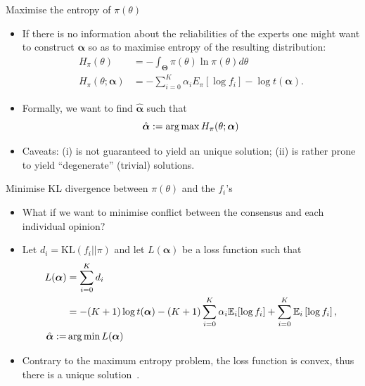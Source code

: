 \begin{frame}{Maximise the entropy of $ \pi(\theta)$ }
 \begin{itemize}
  \item If there is no information about the reliabilities of the experts one might want to construct $\boldsymbol\alpha$ so as to maximise entropy of the resulting distribution:
  \begin{align*}
   H_{\pi}(\theta) &=-\int_{\boldsymbol\Theta}\pi(\theta)\ln\pi(\theta)d\theta \\
   H_{\pi}(\theta; \boldsymbol\alpha) &= -\sum_{i=0}^{K} \alpha_i E_{\pi}[\log f_i] - \log t(\boldsymbol\alpha).
  \end{align*}
  \item Formally, we want to find $\hat{\boldsymbol\alpha}$ such that
  \[\hat{\boldsymbol\alpha}:= \operatorname*{arg\,max} H_{\pi}(\theta; \boldsymbol\alpha)  \]
  \item Caveats: (i) is not guaranteed to yield an unique solution; (ii) is rather prone to yield ``degenerate'' (trivial) solutions.
 \end{itemize}
\end{frame}
\begin{frame}{Minimise KL divergence between $\pi(\theta)$ and the $f_i$'s}
\begin{itemize}
 \item What if we want to minimise conflict between the consensus and each individual opinion?
 \item Let $d_i = \text{KL}(f_i || \pi)$ and let $L(\boldsymbol\alpha)$ be a loss function such that
\begin{align*}
L(\boldsymbol\alpha) &= \sum_{i=0}^Kd_i \\
     &=  - (K+1)\log t(\boldsymbol\alpha) - (K+1) \sum_{i=0}^K\alpha_i \mathbb{E}_i [\log f_i ]  + \sum_{i=0}^K \mathbb{E}_i\left[\log f_i\right], \\
     \hat{\boldsymbol\alpha}:=& \operatorname*{arg\,min} L(\boldsymbol\alpha)   
\end{align*}
\item Contrary to the maximum entropy problem, the loss function is convex, thus there is a unique solution~\citep{rufo2012A}.
\end{itemize}
\end{frame}
